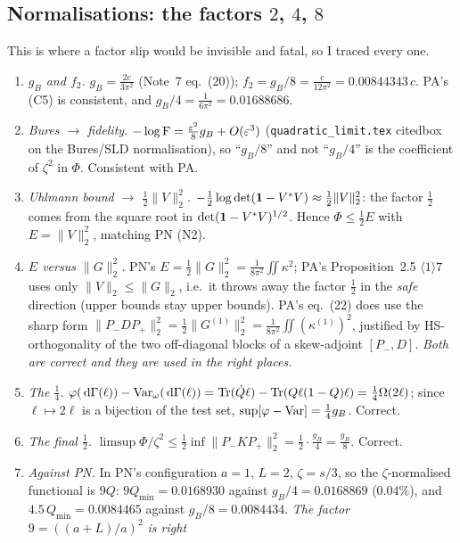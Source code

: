 \documentclass[11pt]{article}
\newcommand{\Pp}{P_+}\newcommand{\Pm}{P_-}
\providecommand{\norm}[1]{\lVert #1\rVert}\providecommand{\abs}[1]{\lvert #1\rvert}
\begin{document}
\subsection{Normalisations: the factors $2$, $4$, $8$}\label{sec:norm}
This is where a factor slip would be invisible and fatal, so I traced every one.
\begin{enumerate}[label=(\alph*),leftmargin=2em]
\item \emph{$g_B$ and $f_2$.}  $g_B=\frac{2c}{3\pi^2}$ (Note~7 eq.~(20)); $f_2=g_B/8=\frac
 c{12\pi^2}=0.00844343\,c$.  PA's (C5) is consistent, and $g_B/4=\frac1{6\pi^2}=0.01688686$.
\item \emph{Bures $\to$ fidelity.}  $-\log\operatorname{F}=\frac{\varepsilon^2}8g_B+O(\varepsilon^3)$
 (\texttt{quadratic\_limit.tex} citedbox on the Bures/SLD normalisation), so ``$g_B/8$'' and not
 ``$g_B/4$'' is the coefficient of $\zeta^2$ in $\Phi$.  Consistent with PA.
\item \emph{Uhlmann bound $\to$ $\frac12\norm V_2^2$.}  $-\frac12\log\det(\one-V^*V)
 \approx\frac12\norm V_2^2$: the factor $\frac12$ comes from the square root in
 $\det(\mathbf 1-V^*V)^{1/2}$.  Hence $\Phi\le\frac12E$ with $E=\norm{V}_2^2$, matching PN (N2).
\item \emph{$E$ versus $\norm G_2^2$.}  PN's $E=\frac12\norm{G}_2^2=\frac1{8\pi^2}\iint\kappa^2$;
 PA's Proposition~2.5 $\langle1\rangle7$ uses only $\norm{V}_2\le\norm{G}_2$, i.e.\ it throws away
 the factor $\frac12$ in the \emph{safe} direction (upper bounds stay upper bounds).  PA's
 eq.~(22) does use the sharp form $\norm{\Pm D\Pp}_2^2=\frac12\norm{G^{(1)}}_2^2
 =\frac1{8\pi^2}\iint(\kappa^{(1)})^2$, justified by HS-orthogonality of the two off-diagonal
 blocks of a skew-adjoint $[\Pm,D]$.  \emph{Both are correct and they are used in the right
 places.}
\item \emph{The $\frac14$.}  $\varphi(\,\mathrm d\Gamma(\ell))-\operatorname{Var}_\omega(\,\mathrm d\Gamma(\ell))
 =\operatorname{Tr}(\dot Q\ell)-\operatorname{Tr}(Q\ell(1-Q)\ell)=\frac14\Omega(2\ell)$; since $\ell\mapsto2\ell$ is a bijection
 of the test set, $\sup[\varphi-\operatorname{Var}]=\frac14g_B$.  Correct.
\item \emph{The final $\frac12$.}  $\limsup\Phi/\zeta^2\le\frac12\inf\norm{\Pm K\Pp}_2^2
 =\frac12\cdot\frac{g_B}4=\frac{g_B}8$.  Correct.
\item \emph{Against PN.}  In PN's configuration $a=1$, $L=2$, $\zeta=s/3$, so the $\zeta$-normalised
 functional is $9Q$: $9Q_{\min}=0.0168930$ against $g_B/4=0.0168869$ ($0.04\%$), and
 $4.5\,Q_{\min}=0.0084465$ against $g_B/8=0.0084434$.  \emph{The factor $9=((a+L)/a)^2$ is right}

\end{enumerate}
\end{document}
